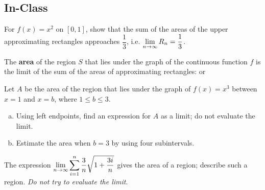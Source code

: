 \documentclass[notes]{subfiles}
\begin{document}
	\subsection*{In-Class}	
		\begin{ex}
			For $f(x) = x^2$ on $[0,1]$, show that the sum of the areas of the upper approximating rectangles approaches $\dfrac{1}{3}$, i.e. $\displaystyle \lim_{n\to\infty} R_n = \dfrac{1}{3}$.
		\end{ex}
			\newpage
	
		\begin{defn}
			The \textbf{area} of the region $S$ that lies under the graph of the continuous function $f$ is the limit of the sum of the areas of approximating rectangles:
				or
		\end{defn}
			
		\begin{ex}
			Let $A$ be the area of the region that lies under the graph of $f(x) = x^3$ between $x = 1$ and $x = b$, where $1\leq b\leq 3$.
			\begin{enumerate}[(a)]
				\item Using left endpoints, find an expression for $A$ as a limit; do not evaluate the limit.
				\item Estimate the area when $b = 3$ by using four subintervals.
			\end{enumerate}
		\end{ex}
		
		\begin{ex}
			The expression $\displaystyle \lim_{n\to \infty} \sum_{i=1}^n \dfrac{3}{n} \sqrt{1+\dfrac{3i}{n}}$ gives the area of a region; describe such a region.  \emph{Do not try to evaluate the limit}.
		\end{ex}
			
			\newpage
		
\end{document}
